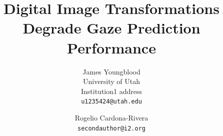 \documentclass[10pt,twocolumn,letterpaper]{article}
\title{Digital Image Transformations Degrade Gaze Prediction Performance}
\author{James Youngblood\\
University of Utah\\
Institution1 address\\
{\tt\small u1235424@utah.edu}
\and
Rogelio Cardona-Rivera\\
{\tt\small secondauthor@i2.org}
}
\begin{document}
\maketitle
    






{
    \small
    
    
}

% 
\end{document}
